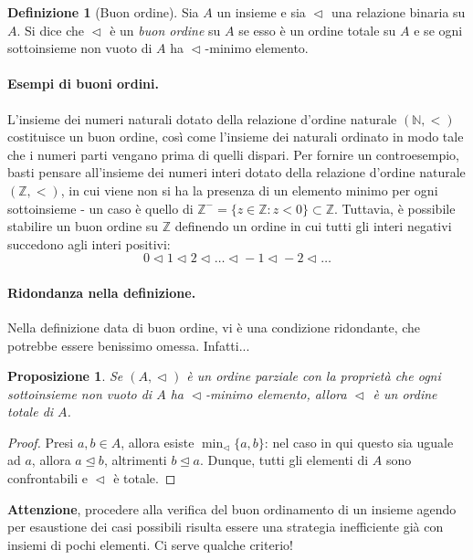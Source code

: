 \documentclass[fontsize = 11 pt, paper=A4, oneside, index=totoc, hyperref]{book}
\theoremstyle{definition}
\newtheorem{dfn}{Definizione}[]
\theoremstyle{plain}
\newtheorem{prp}{Proposizione}[section]
\newcommand{\N}{\mathbb{N}}
\newcommand{\order}{\vartriangleleft}
\newcommand{\ordine}[1]{\vartriangleleft_{\mathrm{#1}}}
\begin{document}
\begin{dfn}[Buon ordine]
  Sia \(A\) un insieme e sia \(\ordine{}\) una relazione binaria su \(A\). Si dice che \(\ordine{}\) è un \emph{buon ordine} su \(A\) se esso è un ordine totale su \(A\) e se ogni sottoinsieme non vuoto di \(A\) ha \(\ordine{}\)-minimo elemento.
\end{dfn}

\paragraph{Esempi di buoni ordini.} L'insieme dei numeri naturali dotato della relazione d'ordine naturale \((\N, <)\) costituisce un buon ordine, così come l'insieme dei naturali ordinato in modo tale che i numeri parti vengano prima di quelli dispari. Per fornire un controesempio, basti pensare all'insieme dei numeri interi dotato della relazione d'ordine naturale \((\mathbb{Z}, <)\), in cui viene non si ha la presenza di un elemento minimo per ogni sottoinsieme - un caso è quello di \(\mathbb{Z}^- = \lbrace z \in \mathbb{Z} \colon z < 0 \rbrace \subset \mathbb{Z}\). Tuttavia, è possibile stabilire un buon ordine su \(\mathbb{Z}\) definendo un ordine in cui tutti gli interi negativi succedono agli interi positivi:
\[
0 \ordine{} 1 \ordine{} 2 \ordine{} \dots \ordine{} -1 \ordine{} -2 \ordine{} \dots
\]

\paragraph{Ridondanza nella definizione.} Nella definizione data di buon ordine, vi è una condizione ridondante, che potrebbe essere benissimo omessa. Infatti...
\begin{prp}
  Se \((A, \ordine{})\) è un ordine parziale con la proprietà che ogni sottoinsieme non vuoto di \(A\) ha \(\ordine{}\)-minimo elemento, allora \(\ordine{}\) è un ordine totale di \(A\).
\end{prp}
\begin{proof}
  Presi \(a,b \in A\), allora esiste \(\min_\order \lbrace a,b \rbrace\): nel caso in qui questo sia uguale ad \(a\), allora \(a \trianglelefteq b\), altrimenti \(b \trianglelefteq a\). Dunque, tutti gli elementi di \(A\) sono confrontabili e \(\ordine{}\) è totale.
\end{proof}

{\bf Attenzione}, procedere alla verifica del buon ordinamento di un insieme agendo per esaustione dei casi possibili risulta essere una strategia inefficiente già con insiemi di pochi elementi. Ci serve qualche criterio!
\end{document}
